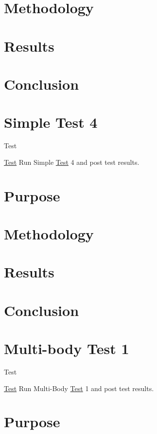 \section*{Methodology}

\section*{Results}

\section*{Conclusion}\hypertarget{SimpleTest4}{}\section{Simple Test 4}\label{SimpleTest4}
\begin{DoxyRefDesc}{Test}
\item[\hyperlink{test__test000008}{Test}]Run Simple \hyperlink{class_test}{Test} 4 and post test results.\end{DoxyRefDesc}


\section*{Purpose}

\section*{Methodology}

\section*{Results}

\section*{Conclusion}\hypertarget{MultiBodyTest1}{}\section{Multi-\/body Test 1}\label{MultiBodyTest1}
\begin{DoxyRefDesc}{Test}
\item[\hyperlink{test__test000001}{Test}]Run Multi-\/\-Body \hyperlink{class_test}{Test} 1 and post test results.\end{DoxyRefDesc}


\section*{Purpose}

